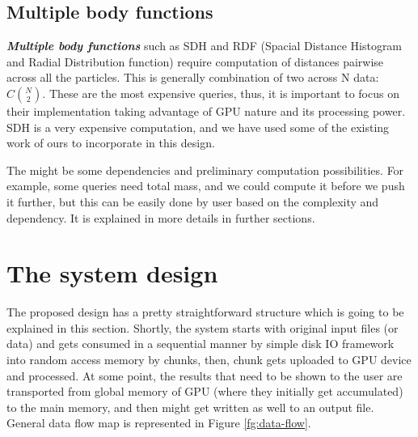 \documentclass[11pt,a4paper]{report}
\begin{document}
\section{Multiple body functions}
\emph{\textbf{Multiple body functions}} such as SDH and RDF (Spacial Distance Histogram and Radial Distribution function) require computation of distances pairwise across all the particles. This is generally combination of two across N data: 	$C\binom{N}{2}$. These are the most expensive queries, thus, it is important to focus on their implementation taking advantage of GPU nature and its processing power. SDH is a very expensive computation, and we have used some of the existing work of ours\cite{sdhgpu} to incorporate in this design.

The might be some dependencies and preliminary computation possibilities. For example, some queries need total mass, and we could compute it before we push it further, but this can be easily done by user based on the complexity and dependency. It is explained in more details in further sections.


\vspace{3mm}
\chapter{The system design}\label{sc:system}
\vspace{3mm}

The proposed design has a pretty straightforward structure which is going to be explained in this section. Shortly, the system starts with original input files (or data) and gets consumed in a sequential manner by simple disk IO framework into random access memory by chunks, then, chunk gets uploaded to GPU device and processed. At some point, the results that need to be shown to the user are transported from global memory of GPU (where they initially get accumulated) to the main memory, and then might get written as well to an output file. General data flow map is represented in Figure  \ref{fg:data-flow}.
\end{document}
